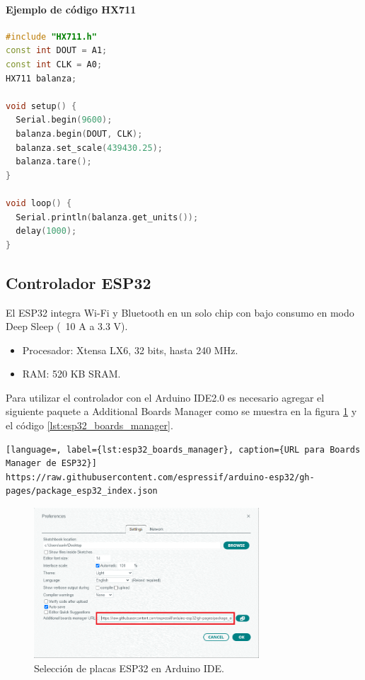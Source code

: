 \paragraph{Ejemplo de código HX711}\mbox{}

\begin{lstlisting}[language=C++, caption={Ejemplo de código HX711}, label={lst:ejemplo_hx711}]
#include "HX711.h"
const int DOUT = A1;
const int CLK = A0;
HX711 balanza;

void setup() {
  Serial.begin(9600);
  balanza.begin(DOUT, CLK);
  balanza.set_scale(439430.25);
  balanza.tare();
}

void loop() {
  Serial.println(balanza.get_units());
  delay(1000);
}
\end{lstlisting}

\subsection{Controlador ESP32}
El ESP32 integra Wi-Fi y Bluetooth en un solo chip con bajo consumo en modo Deep Sleep (~10 \textmu{}A a 3.3 V).
\begin{itemize}
    \item Procesador: Xtensa LX6, 32 bits, hasta 240 MHz.
    \item RAM: 520 KB SRAM.
\end{itemize}

Para utilizar el controlador con el Arduino IDE2.0 es necesario agregar el siguiente paquete a Additional Boards Manager como se muestra en la figura  \ref{fig:arduino_placas} y el código \ref{lst:esp32_boards_manager}.
\begin{lstlisting}[language=, label={lst:esp32_boards_manager}, caption={URL para Boards Manager de ESP32}]
https://raw.githubusercontent.com/espressif/arduino-esp32/gh-pages/package_esp32_index.json
\end{lstlisting}

\newpage

\begin{figure}[!ht]
    \centering
    \includegraphics[width=0.75\textwidth]{assets/metodos_herramientas/arduino_placas.png}
    \caption{Selección de placas ESP32 en Arduino IDE.}
    \label{fig:arduino_placas}
\end{figure}

